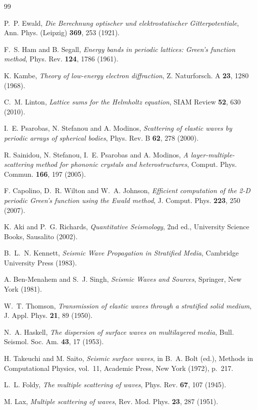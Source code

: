 \documentclass[11pt,a4paper]{article}
\begin{document}
\begin{thebibliography}{99}

 P.~P. Ewald, \emph{Die Berechnung optischer und elektrostatischer
Gitterpotentiale}, Ann. Phys. (Leipzig) \textbf{369}, 253 (1921).

 F.~S. Ham and B. Segall, \emph{Energy bands in periodic lattices:
Green's function method}, Phys. Rev. \textbf{124}, 1786 (1961).

 K. Kambe, \emph{Theory of low-energy electron diffraction}, Z.
Naturforsch. A \textbf{23}, 1280 (1968).

 C.~M. Linton, \emph{Lattice sums for the Helmholtz equation}, SIAM
Review \textbf{52}, 630 (2010).

 I.~E. Psarobas, N. Stefanou and A. Modinos, \emph{Scattering of
elastic waves by periodic arrays of spherical bodies}, Phys. Rev. B \textbf{62}, 278 (2000).

 R. Sainidou, N. Stefanou, I.~E. Psarobas and A. Modinos, \emph{A
layer-multiple-scattering method for phononic crystals and heterostructures}, Comput. Phys.
Commun. \textbf{166}, 197 (2005).

 F. Capolino, D.~R. Wilton and W.~A. Johnson, \emph{Efficient
computation of the 2-D periodic Green's function using the Ewald method}, J. Comput. Phys.
\textbf{223}, 250 (2007).

 K. Aki and P.~G. Richards, \emph{Quantitative Seismology}, 2nd ed.,
University Science Books, Sausalito (2002).

 B.~L.~N. Kennett, \emph{Seismic Wave Propagation in Stratified Media},
Cambridge University Press (1983).

 A. Ben-Menahem and S.~J. Singh, \emph{Seismic Waves and Sources},
Springer, New York (1981).

 W.~T. Thomson, \emph{Transmission of elastic waves through a stratified
solid medium}, J. Appl. Phys. \textbf{21}, 89 (1950).

 N.~A. Haskell, \emph{The dispersion of surface waves on multilayered
media}, Bull. Seismol. Soc. Am. \textbf{43}, 17 (1953).

 H. Takeuchi and M. Saito, \emph{Seismic surface waves}, in
B.~A. Bolt (ed.), Methods in Computational Physics, vol.~11, Academic Press, New York (1972),
p.~217.

 L.~L. Foldy, \emph{The multiple scattering of waves}, Phys. Rev.
\textbf{67}, 107 (1945).

 M. Lax, \emph{Multiple scattering of waves}, Rev. Mod. Phys. \textbf{23},
287 (1951).

\end{thebibliography}
\end{document}
